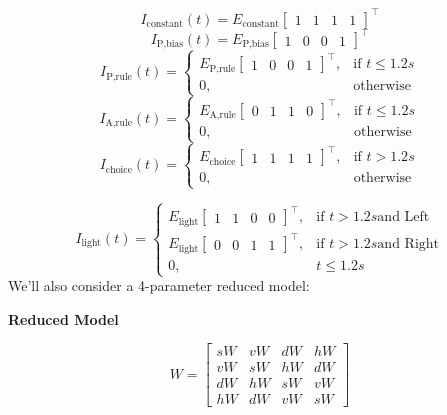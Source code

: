 \documentclass[11pt]{article}
\begin{document}
\[I_{\text{constant}}(t) = E_{\text{constant}} \begin{bmatrix} 1 & 1 & 1 & 1 \end{bmatrix}^\top \]
\[I_{\text{P,bias}}(t) = E_{\text{P,bias}} \begin{bmatrix} 1 & 0 & 0 & 1 \end{bmatrix}^\top \]
\[I_{\text{P,rule}}(t) = \begin{cases}
                           E_{\text{P,rule}} \begin{bmatrix} 1 & 0 & 0 & 1 \end{bmatrix}^\top,& \text{if } t\leq 1.2s \\
                            0,              & \text{otherwise}
                         \end{cases}\]
\[I_{\text{A,rule}}(t) = \begin{cases}
                           E_{\text{A,rule}} \begin{bmatrix} 0 & 1 & 1 & 0 \end{bmatrix}^\top,& \text{if } t\leq 1.2s \\
                            0,              & \text{otherwise}
                         \end{cases}\]
\[I_{\text{choice}}(t) = \begin{cases}
                           E_{\text{choice}} \begin{bmatrix} 1 & 1 & 1 & 1 \end{bmatrix}^\top,& \text{if } t > 1.2s \\
                            0,              & \text{otherwise}
                         \end{cases}\]
                         
\[I_{\text{light}}(t) = \begin{cases}
                           E_{\text{light}} \begin{bmatrix} 1 & 1 & 0 & 0 \end{bmatrix}^\top,& \text{if } t > 1.2s \text{and Left} \\
                           E_{\text{light}} \begin{bmatrix} 0 & 0 & 1 & 1 \end{bmatrix}^\top,& \text{if } t > 1.2s \text{and Right} \\
                            0,              & t \leq 1.2s
                         \end{cases}\]
We'll also consider a 4-parameter reduced model:
\begin{center}
\textbf{Reduced Model} \\
\end{center}
\begin{equation}
W = \begin{bmatrix} sW & vW &  dW & hW \\ vW  & sW & hW  & dW \\ dW & hW & sW & vW \\  hW & dW & vW  & sW \end{bmatrix}
\end{equation}
\end{document}
